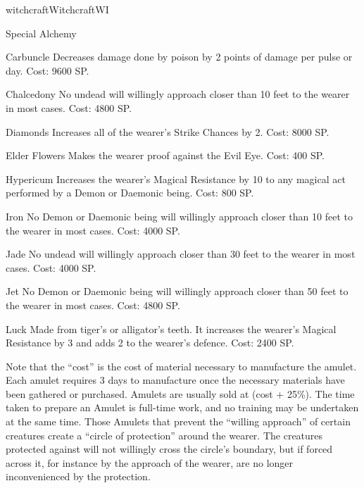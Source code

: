 \begin{College}[1.1]{witchcraft}{Witchcraft}{WI}
\begin{talent}[T-2]{Special Alchemy}
\begin{effects}
\begin{Description}
\begin{Description}
\item[Carbuncle] Decreases damage done by poison by 2 points of damage
  per pulse or day. Cost: 9600 SP.

\item[Chalcedony] No undead will willingly approach closer than 10
  feet to the wearer in most cases.  Cost: 4800 SP.

\item[Diamonds] Increases all of the wearer’s Strike Chances by
  2. Cost: 8000 SP.

\item[Elder Flowers] Makes the wearer proof against the Evil
  Eye. Cost: 400 SP.

\item[Hypericum] Increases the wearer’s Magical Resistance by 10 to
  any magical act performed by a Demon or Daemonic being. Cost: 800
  SP.

\item[Iron] No Demon or Daemonic being will willingly approach closer
  than 10 feet to the wearer in most cases. Cost: 4000 SP.

\item[Jade] No undead will willingly approach closer than 30 feet to
  the wearer in most cases. Cost: 4000 SP.

\item[Jet] No Demon or Daemonic being will willingly approach closer
  than 50 feet to the wearer in most cases. Cost: 4800 SP.

\item[Luck] Made from tiger’s or alligator’s teeth.  It increases the
  wearer’s Magical Resistance by 3 and adds 2 to the wearer’s
  defence. Cost: 2400 SP.
\end{Description}
Note that the “cost” is the cost of material necessary to manufacture
the amulet.  Each amulet requires 3 days to manufacture once the
necessary materials have been gathered or purchased.  Amulets are
usually sold at (cost + 25\%).  The time taken to prepare an Amulet is
full-time work, and no training may be undertaken at the same time.
Those Amulets that prevent the “willing approach” of certain creatures
create a “circle of protection” around the wearer. The creatures
protected against will not willingly cross the circle’s boundary, but
if forced across it, for instance by the approach of the wearer, are
no longer inconvenienced by the protection.


\end{Description}
\end{effects}
\end{talent}
\end{College}
